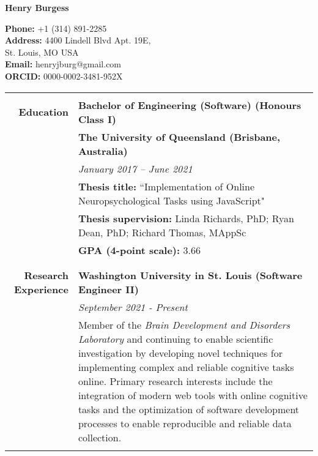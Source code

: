 \documentclass{article}
\begin{document}
	\begin{minipage}{2.5in}
		\huge\textbf{Henry Burgess} 
	\end{minipage}
	\hfill
	\begin{minipage}{3in}
		\textbf{Phone:}  +1 (314) 891-2285 \\
		\hfill \textbf{Address:} 4400 Lindell Blvd Apt. 19E, \\
		St. Louis, MO USA \\
		\textbf{Email:} henryjburg@gmail.com \\
		\textbf{ORCID:} 0000-0002-3481-952X
	\end{minipage}

	\begin{longtable}{>{\columncolor{LeftColumn}}r | p{13cm}}
											\hline \\
		\large\textbf{Education} 		  	& \large\textbf{Bachelor of Engineering (Software) (Honours Class I)} \\
											& \textbf{The University of Queensland (Brisbane, Australia)} \\
											& \textit{January 2017 – June 2021} \\
											& \textbf{Thesis title:} ``Implementation of Online Neuropsychological Tasks using JavaScript" \\
											& \textbf{Thesis supervision:} Linda Richards, PhD; Ryan Dean, PhD; Richard Thomas, MAppSc \\
											& \textbf{GPA (4-point scale):} 3.66 \\
											& \\
											\hline \\

		\large\textbf{Research Experience}  & \large\textbf{Washington University in St. Louis (Software Engineer II)} \\
											& \textit{September 2021 - Present} \\
											& Member of the \textit{Brain Development and Disorders Laboratory} and continuing to enable scientific investigation by developing novel techniques for implementing complex and reliable cognitive tasks online. Primary research interests include the integration of modern web tools with online cognitive tasks and the optimization of software development processes to enable reproducible and reliable data collection. \\ 
											& \\


\end{longtable}
\end{document}
